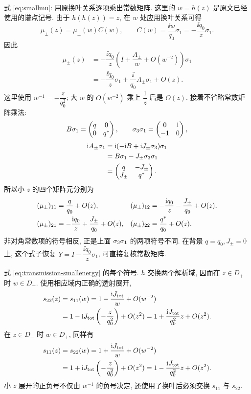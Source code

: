 \par\smallskip\noindent 式 \eqref{eq:smallmu}: 用原换叶关系逐项乘出常数矩阵.\quad
这里的 $w=h(z)$ 是原文已经使用的谱点记号.
由于 $h(h(z))=z$, 在 $w$ 处应用换叶关系可得
\begin{equation*}
\mu_\pm(z)=\mu_\pm(w)C(w),
\qquad
C(w)=\dfrac{\ii w}{q_0}\sigma_1
=-\dfrac{\ii q_0}{z}\sigma_1.
\end{equation*}
因此
\begin{align*}
\mu_\pm(z)
&=-\dfrac{\ii q_0}{z}
\left(I+\dfrac{A_\pm}{w}+O(w^{-2})\right)\sigma_1\\
&=-\dfrac{\ii q_0}{z}\sigma_1
+\dfrac{\ii}{q_0}A_\pm\sigma_1+O(z).
\end{align*}
这里使用 $w^{-1}=-\dfrac{z}{q_0^2}$;
大 $w$ 的 $O(w^{-2})$ 乘上 $\dfrac{1}{z}$ 后是 $O(z)$.
接着不省略常数矩阵乘法:
\begin{equation*}
B\sigma_1=\begin{pmatrix}q&0\\0&{q}^{*}\end{pmatrix},
\qquad
\sigma_3\sigma_1=\begin{pmatrix}0&1\\-1&0\end{pmatrix},
\end{equation*}
\begin{align*}
\mathrm{i} A_\pm\sigma_1
&=\mathrm{i}(-\mathrm{i} B+\mathrm{i} J_\pm\sigma_3)\sigma_1\\
&=B\sigma_1-J_\pm\sigma_3\sigma_1\\
&=\begin{pmatrix}q&-J_\pm\\J_\pm&{q}^{*}\end{pmatrix}.
\end{align*}
所以小 $z$ 的四个矩阵元分别为
\begin{align*}
(\mu_\pm)_{11}&=\dfrac{q}{q_0}+O(z),&
(\mu_\pm)_{12}&=-\dfrac{\mathrm{i} q_0}{z}-\dfrac{J_\pm}{q_0}+O(z),\\
(\mu_\pm)_{21}&=-\dfrac{\mathrm{i} q_0}{z}+\dfrac{J_\pm}{q_0}+O(z),&
(\mu_\pm)_{22}&=\dfrac{{q}^{*}}{q_0}+O(z).
\end{align*}
非对角常数项的符号相反, 正是上面 $\sigma_3\sigma_1$ 的两项符号不同.
在背景 $q=q_0,J_\pm=0$ 上, 这个式子恢复
$Y=I-\dfrac{\ii q_0}{z}\sigma_1$, 可直接复核常数矩阵.

\par\smallskip\noindent 式 \eqref{eq:transmission-smallenergy} 的每个符号.\quad
$h$ 交换两个解析域, 因而在 $z\in D_+$ 时 $w\in D_-$.
使用相应域内正确的透射展开,
\begin{align*}
s_{22}(z)
&=s_{11}(w)
=1-\dfrac{\mathrm{i} J_{\rm tot}}{w}+O(w^{-2})\\
&=1-\mathrm{i} J_{\rm tot}\left(-\dfrac{z}{q_0^2}\right)+O(z^2)
=1+\dfrac{\mathrm{i} J_{\rm tot}}{q_0^2}z+O(z^2).
\end{align*}
在 $z\in D_-$ 时 $w\in D_+$, 同样有
\begin{align*}
s_{11}(z)
&=s_{22}(w)
=1+\dfrac{\mathrm{i} J_{\rm tot}}{w}+O(w^{-2})\\
&=1+\mathrm{i} J_{\rm tot}\left(-\dfrac{z}{q_0^2}\right)+O(z^2)
=1-\dfrac{\mathrm{i} J_{\rm tot}}{q_0^2}z+O(z^2).
\end{align*}
小 $z$ 展开的正负号不仅由 $w^{-1}$ 的负号决定,
还使用了换叶后必须交换 $s_{11}$ 与 $s_{22}$.

